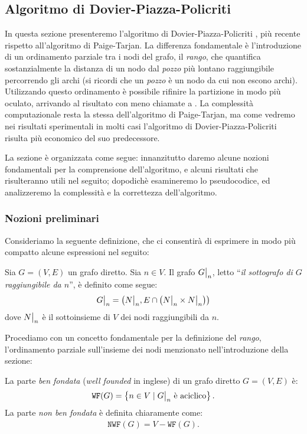 \subsection{Algoritmo di Dovier-Piazza-Policriti}
\label{sec:dovier_piazza_policriti}
In questa sezione presenteremo l'algoritmo di Dovier-Piazza-Policriti \cite{dovier}, più recente rispetto all'algoritmo di Paige-Tarjan. La differenza fondamentale è l'introduzione di un ordinamento parziale tra i nodi del grafo, il \emph{rango}, che quantifica sostanzialmente la distanza di un nodo dal \emph{pozzo} più lontano raggiungibile percorrendo gli archi (si ricordi che un \emph{pozzo} è un nodo da cui non escono archi). Utilizzando questo ordinamento è possibile rifinire la partizione in modo più oculato, arrivando al risultato con meno chiamate a \splitfunc. La complessità computazionale resta la stessa dell'algoritmo di Paige-Tarjan, ma come vedremo nei risultati sperimentali in molti casi l'algoritmo di Dovier-Piazza-Policriti risulta più economico del suo predecessore.

La sezione è organizzata come segue: innanzitutto daremo alcune nozioni fondamentali per la comprensione dell'algoritmo, e alcuni risultati che risulteranno utili nel seguito; dopodichè esamineremo lo pseudocodice, ed analizzeremo la complessità e la correttezza dell'algoritmo.

\subsubsection{Nozioni preliminari}
\label{sec:fba_preliminari}
Consideriamo la seguente definizione, che ci consentirà di esprimere in modo più compatto alcune espressioni nel seguito:
\begin{definition}
    \label{def:grafo_restr}
    Sia $G = (V,E)$ un grafo diretto. Sia $n \in V$. Il grafo $\restr{G}{n}$, letto ``\emph{il sottografo di $G$ raggiungibile da $n$}'', è definito come segue:
    \begin{gather*}
        \restr{G}{n} = \left(\restr{N}{n}, E \cap \left(\restr{N}{n} \times \restr{N}{n}\right)\right)
    \end{gather*}
    dove $\restr{N}{n}$ è il sottoinsieme di $V$ dei nodi raggiungibili da $n$.
\end{definition}

Procediamo con un concetto fondamentale per la definizione del \emph{rango}, l'ordinamento parziale sull'insieme dei nodi menzionato nell'introduzione della sezione:
\begin{definition}
    La parte \emph{ben fondata} (\emph{well founded} in inglese) di un grafo diretto $G = (V,E)$ è:
    \begin{gather*}
        \texttt{WF}(G) = \left\{n \in V \mid \restr{G}{n} \text{ è aciclico}\right\}.
    \end{gather*}
    La parte \emph{non ben fondata} è definita chiaramente come:
    \begin{gather*}
        \texttt{NWF}(G) = V - \texttt{WF}(G).
    \end{gather*}
\end{definition}


